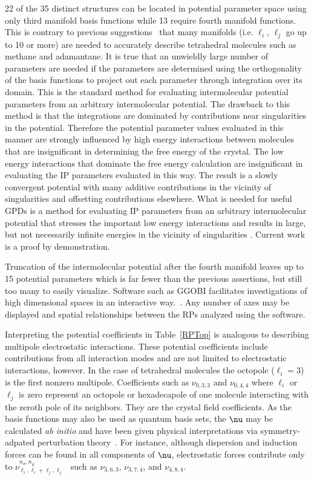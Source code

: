 \documentclass[preprint]{iucr}              %
\newcommand{\mb}[1]{\ensuremath{\mbox{\boldmath $ #1 $}}}
\begin{document}
22 of the 35 distinct structures can be located in potential
parameter space using only third manifold basis functions while 13
require fourth manifold functions. This is contrary to previous
suggestions~\cite{Briels80} that many manifolds (i.e. $\ell_i$,  $\ell_j$ go up
to 10 or more)  are needed to
accurately describe tetrahedral molecules such as methane and
adamantane. It is true that an unwieldly large number of parameters are needed
if the parameters are determined using the orthogonality of the basis functions
to project out each parameter through integration over its domain.  This is the
standard method for evaluating intermolecular potential parameters from an
arbitrary intermolecular potential.  The drawback to this method is that the
integrations are dominated by contributions near singularities in the potential.
 Therefore the potential parameter values evaluated in this manner are strongly
influenced by high energy interactions between molecules that are insignificant
in determining the free energy of the crystal.  The low energy interactions that
dominate the free energy calculation are insignificant in evaluating the IP
parameters evaluated in this way.  The result is a slowly convergent potential
with many additive contributions in the vicinity of singularities and offsetting
contributions elsewhere.  What is needed for useful GPDs is a method for
evaluating IP parameters from an arbitrary intermolecular potential that
stresses the important low energy interactions and results in large, but not
necessarily infinite energies in the vicinity of singularities
\cite{Missaghi09}.  Current work is a proof by
demonstration.

Truncation of the intermolecular potential after the fourth manifold leaves up
to 15 potential parameters which is far fewer than the previous assertions, but
still too many to easily visualize.  Software such as {G\footnotesize GOBI}
facilitates investigations of high dimensional spaces in an
interactive way.~\cite{ggobi03}.  Any number of axes may be displayed and
spatial relationships between the RPs analyzed using the software.

Interpreting the potential coefficients in Table~\ref{RPTop} is
analogous to describing multipole electrostatic interactions. These potential
coefficients include contributions from all interaction modes and are not
limited
to electrostatic  interactions, however. In the case of tetrahedral molecules
the octopole ($\ell_i=3$) is the first nonzero multipole.
Coefficients such as $\nu_{0,3,3}$ and $\nu_{0,4,4}$ where $\ell_i$
or $\ell_j$ is zero represent an octopole or hexadecapole of one molecule
interacting with the zeroth pole of its neighbors.  They are the crystal field
coefficients. As the basis functions may also be used as quantum
basis sets, the $\mb{\nu}$ may be calculated \emph{ab initio} and
have been given physical interpretations via symmetry-adpated
perturbation theory~\cite{Avoird94}.  For instance, although
dispersion and induction forces can be found in all components of
$\mb{\nu}$, electrostatic forces contribute only to
$\nu^{n_\sigma,n_\mu}_{\ell_i,\ell_i+\ell_j,\ell_j}$~\cite{Stone84}
such as $\nu_{3,6,3}$, $\nu_{3,7,4}$, and $\nu_{4,8,4}$.
\end{document}

